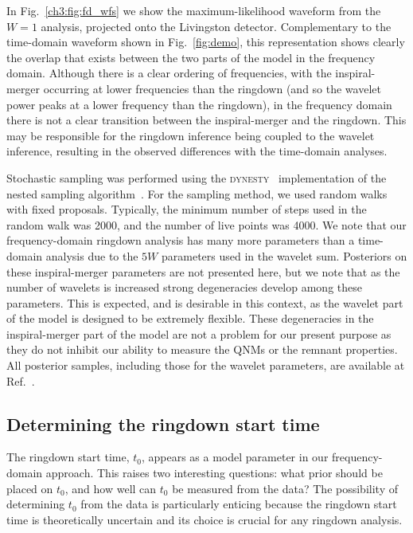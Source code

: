 In Fig.~\ref{ch3:fig:fd_wfs} we show the maximum-likelihood waveform from the $W=1$ analysis, projected onto the Livingston detector.
Complementary to the time-domain waveform shown in Fig.~\ref{fig:demo}, this representation shows clearly the overlap that exists between the two parts of the model in the frequency domain.
Although there is a clear ordering of frequencies, with the inspiral-merger occurring at lower frequencies than the ringdown (and so the wavelet power peaks at a lower frequency than the ringdown), in the frequency domain there is not a clear transition between the inspiral-merger and the ringdown.
This may be responsible for the ringdown inference being coupled to the wavelet inference, resulting in the observed differences with the time-domain analyses.

Stochastic sampling was performed using the \textsc{dynesty}~\cite{Speagle:2019ivv} implementation of the nested sampling algorithm~\cite{doi:10.1063/1.1835238, Skilling:2006gxv}.
For the sampling method, we used random walks with fixed proposals.
Typically, the minimum number of steps used in the random walk was 2000, and the number of live points was 4000.
We note that our frequency-domain ringdown analysis has many more parameters than a time-domain analysis due to the $5W$ parameters used in the wavelet sum.
Posteriors on these inspiral-merger parameters are not presented here, but we note that as the number of wavelets is increased strong degeneracies develop among these parameters.
This is expected, and is desirable in this context, as the wavelet part of the model is designed to be extremely flexible. 
These degeneracies in the inspiral-merger part of the model are not a problem for our present purpose as they do not inhibit our ability to measure the QNMs or the remnant properties. 
All posterior samples, including those for the wavelet parameters, are available at Ref.~\cite{finch_eliot_2021_5569759}.


\subsection{Determining the ringdown start time}\label{subsec:t0}

The ringdown start time, $t_0$, appears as a model parameter in our frequency-domain approach.
This raises two interesting questions: what prior should be placed on $t_0$, and how well can $t_0$ be measured from the data?
The possibility of determining $t_0$ from the data is particularly enticing because the ringdown start time is theoretically uncertain and its choice is crucial for any ringdown analysis.

